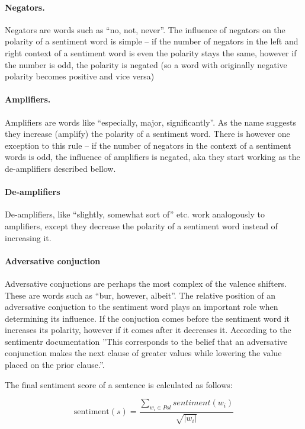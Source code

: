 \paragraph{Negators.} Negators are words such as ``no, not, never''. The influence of negators on the polarity of a sentiment word is simple -- if the number of negators in the left and right context of a sentiment word is even the polarity stays the same, however if the number is odd, the polarity is negated (so a word with originally negative polarity becomes positive and vice versa)

\paragraph{Amplifiers.} Amplifiers are words like ``especially, major, significantly''. As the name suggests they increase (amplify) the polarity of a sentiment word. There is however one exception to this rule -- if the number of negators in the context of a sentiment words is odd, the influence of amplifiers is negated, aka they start working as the de-amplifiers described bellow.

\paragraph{De-amplifiers} De-amplifiers, like ``slightly, somewhat sort of'' etc. work analogously to amplifiers, except they decrease the polarity of a sentiment word instead of increasing it.

\paragraph{Adversative conjuction} Adversative conjuctions are perhaps the most complex of the valence shifters. These are words such as ``bur, however, albeit''. The relative position of an adversative conjuction to the sentiment word plays an important role when determining its influence. If the conjuction comes before the sentiment word it increases its polarity, however if it comes after it decreases it. According to the sentimentr documentation ''This corresponds to the belief that an adversative conjunction makes the next clause of greater values while lowering the value placed on the prior clause.''. \cite{sentimentr}


The final sentiment score of a sentence is calculated as follows:

$$\textrm{sentiment}(s) = \frac{\sum_{w_{i} \in Pol} sentiment(w_{i})}{\sqrt{|w_{i}|}}$$

